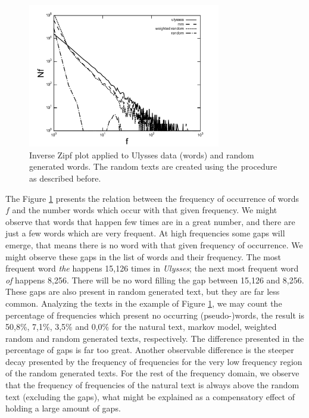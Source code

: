 \begin{figure}[h!]
\centering
\includegraphics[width=0.75\textwidth]{images/inverse_zipf_ulysses_words.pdf}
\caption{Inverse Zipf plot applied to Ulysses data (words) and random generated words. The random texts
are created using the procedure as described before.}
\label{fig:inverse_zipf_ulysses_words}
\end{figure} 

The Figure \ref{fig:inverse_zipf_ulysses_words} presents the relation between the frequency of occurrence
of words $f$ and the number words which occur with that given frequency. We might observe that
words that happen few times are in a great number, and there are just a few words which are
very frequent. At high frequencies some gaps will emerge, that means there is no word with that
given frequency of occurrence. We might observe these gaps in the list of words and their frequency.
The most frequent word \textit{the} happens 15,126 times in \textit{Ulysses}; the next most frequent
word \textit{of} happens 8,256. There will be no word filling the gap between 15,126 and 8,256.
These gaps are also present in random generated text, but they are far less common.
Analyzing the texts in the example of Figure \ref{fig:inverse_zipf_ulysses_words}, we may
count the percentage of frequencies which present no occurring (pseudo-)words, the result is
50,8\%, 7,1\%, 3,5\% and 0,0\% for the natural text, markov model, weighted random and random generated
texts, respectively. The difference presented in the percentage of gaps is far too great. Another
observable difference is the steeper decay presented by the frequency of frequencies for the very low
frequency region of the random generated texts. For the rest of the frequency domain, we observe that
the frequency of frequencies of the natural text is always above the random text (excluding the gaps), what
might be explained as a compensatory effect of holding a large amount of gaps. 

